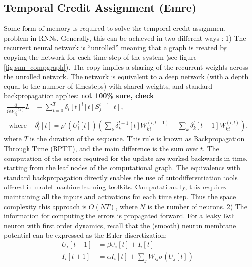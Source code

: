 \documentclass[journal,onecolumn,11pt]{IEEEtran}
\begin{document}
\subsection{Temporal Credit Assignment (Emre)}
\label{sec:temporal_credit_assignment}
Some form of memory is required to solve the temporal credit assignment problem in RNNs. 
Generally, this can be achieved in two different ways \cite{Williams_Zipser89_learalgo}:
1) The recurrent neural network is ``unrolled'' meaning that a graph is created by copying the network for each time step of the system (see figure \ref{fig:snn_compgraph}). The copy implies a sharing of the recurrent weights across the unrolled network. The network is equivalent to a deep network (with a depth equal to the number of timesteps) with shared weights, and standard backpropagation applies:
%
{\bf not 100\% sure, check}
\begin{equation}\label{eq:bp_deep}
  \begin{split}
    \frac{\mathrm{\partial}}{\mathrm{\partial} W^{(l,l)}_{ij}} L & = \sum_{t=0}^T \delta_{i}[t]^{l}[t]  S^{l-1}_j[t],\\
      \text{ where } &
      \delta_{i}^{l} [t] = \rho'\left( U_i^l [t] \right) \left( \sum_k \delta_{k}^{l+1}[t] W_{ki}^{(l,l+1)} + \sum_k \delta_{k}^{l}[t+1] W_{ki}^{(l,l)} \right),
  \end{split}
\end{equation}
%
where $T$ is the duration of the sequence.
This rule is known as Backpropagation Through Time (BPTT), and the main difference is the sum over $t$. The computation of the errors required for the update are worked backwards in time, starting from the leaf nodes of the computational graph.
The equivalence with standard backpropagation directly enables the use of autodifferentiation tools offered in model machine learning toolkits.
Computationally, this requires maintaining all the inputs and activations for each time step. Thus the space complexity this approach is $O(N T)$, where $N$ is the number of neurons.
2) The information for computing the errors is propagated forward.
For a leaky I\&F neuron with first order dynamics, recall that the (smooth) neuron membrane potential can be expressed as the Euler discretization:
\[
\begin{split}
U_i[t+1] & = \beta U_i[t] + I_i[t]\\
  I_i[t+1] & = \alpha I_i[t] + \sum_j W_{ij} \sigma(U_j[t])
\end{split}
\]
\end{document}
